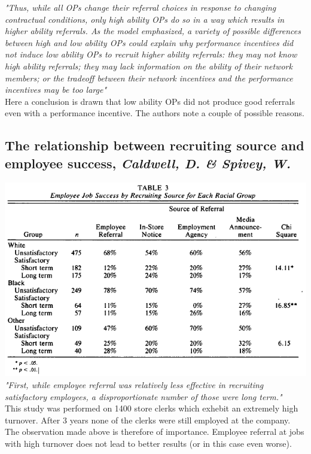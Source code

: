 \documentclass[a4paper, 11pt]{article} %
\begin{document}
\emph{"Thus, while all OPs change their referral choices in response to changing contractual conditions,
only high ability OPs do so in a way which results in higher ability referrals. As the model
emphasized, a variety of possible differences between high and low ability OPs could explain why
performance incentives did not induce low ability OPs to recruit higher ability referrals: they
may not know high ability referrals; they may lack information on the ability of their network
members; or the tradeoff between their network incentives and the performance incentives may
be too large"}\\

Here a conclusion is drawn that low ability OPs did not produce good referrals even with a performance incentive. The authors note a couple of possible reasons.

\subsection*{The relationship between recruiting source and employee success, \emph{Caldwell, D. \& Spivey, W.} \cite{second}}

\includegraphics[width=\textwidth]{table3} \\

\emph{"First, while employee referral was relatively
less effective in recruiting satisfactory employees, a disproportionate
number of those were long term."} \\

This study was performed on 1400 store clerks which exhebit an extremely high turnover. After 3 years none of the clerks were still employed at the company. The observation made above is therefore of importance. Employee referral at jobs with high turnover does not lead to better results (or in this case even worse).
\end{document}
